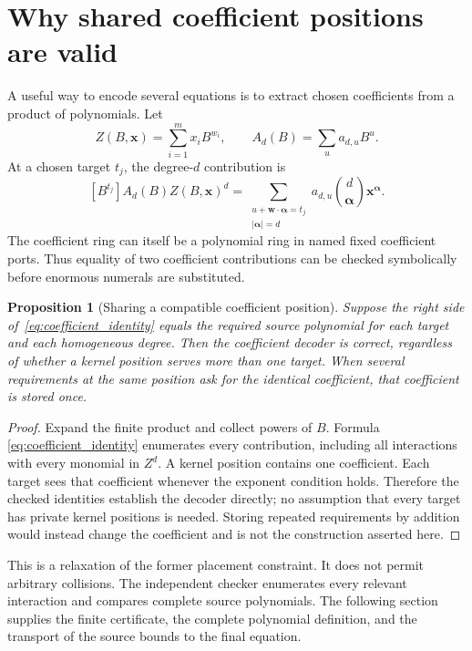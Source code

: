 \documentclass[11pt,a4paper]{article}
\newtheorem{proposition}[theorem]{Proposition}
\theoremstyle{definition}\newtheorem{definition}[theorem]{Definition}
\theoremstyle{remark}\newtheorem{remark}[theorem]{Remark}
\begin{document}
\section{Why shared coefficient positions are valid}
\label{sec:sharing_principle}
A useful way to encode several equations is to extract chosen coefficients
from a product of polynomials. Let
\[
 Z(B,\mathbf x)=\sum_{i=1}^{m}x_iB^{w_i},\qquad
 A_d(B)=\sum_{u}a_{d,u}B^u.
\]
At a chosen target $t_j$, the degree-$d$ contribution is
\begin{equation}\label{eq:coefficient_identity}
 [B^{t_j}]A_d(B)Z(B,\mathbf x)^d
 =\sum_{\substack{u+\mathbf w\cdot\boldsymbol\alpha=t_j\\
             |\boldsymbol\alpha|=d}}
   a_{d,u}\binom d{\boldsymbol\alpha}\mathbf x^{\boldsymbol\alpha}.
\end{equation}
The coefficient ring can itself be a polynomial ring in named fixed
coefficient ports. Thus equality of two coefficient contributions can be
checked symbolically before enormous numerals are substituted.

\begin{proposition}[Sharing a compatible coefficient position]
Suppose the right side of~\eqref{eq:coefficient_identity} equals the required
source polynomial for each target and each homogeneous degree. Then the
coefficient decoder is correct, regardless of whether a kernel position
serves more than one target. When several requirements at the same position
ask for the identical coefficient, that coefficient is stored once.
\end{proposition}
\begin{proof}
Expand the finite product and collect powers of $B$. Formula
\eqref{eq:coefficient_identity} enumerates every contribution, including
all interactions with every monomial in $Z^d$. A kernel position contains
one coefficient. Each target sees that coefficient whenever the exponent
condition holds. Therefore the checked identities establish the decoder
directly; no assumption that every target has private kernel positions is
needed. Storing repeated requirements by addition would instead change
the coefficient and is not the construction asserted here.
\end{proof}

This is a relaxation of the former placement constraint. It does not
permit arbitrary collisions. The independent checker enumerates every
relevant interaction and compares complete source polynomials. The
following section supplies the finite certificate, the complete polynomial
definition, and the transport of the source bounds to the final equation.
\end{document}
